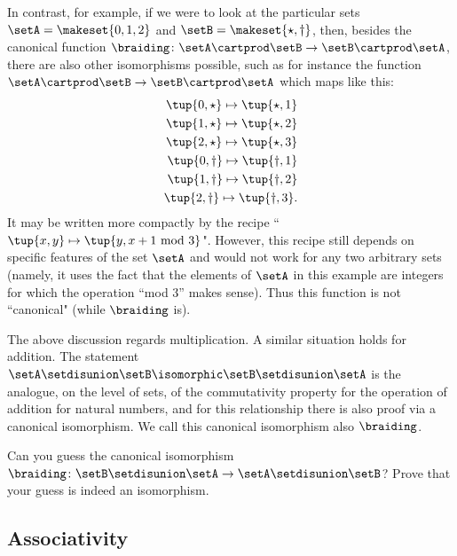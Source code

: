 In contrast, for example, if we were to look at the particular sets $\setA = \makeset{0, 1, 2}$ and $\setB = \makeset{\star, \dagger}$, then, besides the canonical function $\braiding \colon \setA \cartprod \setB \to \setB \cartprod \setA$, there are also other isomorphisms possible, such as for instance the function $\setA \cartprod \setB \to \setB \cartprod \setA$ which maps like this: 
\begin{align}
\tup{0, \star} \mapsto \tup{\star, 1} \\
\tup{1, \star} \mapsto \tup{\star, 2} \\
\tup{2, \star} \mapsto \tup{\star, 3} \\
\tup{0, \dagger} \mapsto \tup{\dagger, 1} \\
\tup{1, \dagger} \mapsto \tup{\dagger, 2} \\
\tup{2, \dagger} \mapsto \tup{\dagger, 3}.
\end{align}
It may be written more compactly by the recipe ``$\tup{x, y} \mapsto \tup{y, x +1 \text{ mod } 3}$". However, this recipe still depends on specific features of the  set $\setA$ and would not work for any two arbitrary sets (namely, it uses the fact that the elements of $\setA$ in this example are integers for which the operation ``mod 3'' makes sense). Thus this function is not ``canonical" (while $\braiding$ is). 

The above discussion regards multiplication. A similar situation holds for addition. The statement $\setA \setdisunion \setB \isomorphic \setB \setdisunion \setA$ is the analogue, on the level of sets, of the commutativity property for the operation of addition for natural numbers, and for this relationship there is also proof via a canonical isomorphism. We call this canonical isomorphism also $\braiding$. 

\begin{exercise}\label{ex:braiding-disjoint-union}
Can you guess the canonical isomorphism $\braiding \colon \setB \setdisunion \setA \to \setA \setdisunion \setB$? Prove that your guess is indeed an isomorphism. 
\end{exercise}

\begin{solution}
\end{solution}

\subsection{Associativity}

